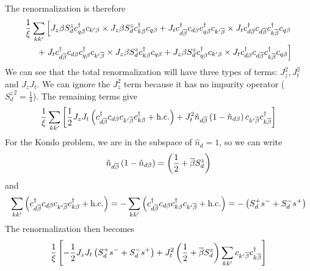 \documentclass[12pt,twoside]{report}
\numberwithin{equation}{section}
\begin{document}
The renormalization is therefore
\begin{equation}\begin{aligned}
	\frac{1}{\xi}\sum_{kk^\prime} \left[J_z \beta S_d^z c^\dagger_{q\beta}c_{k^\prime\beta}\times J_z \beta S_d^z c^\dagger_{k\beta}c_{q\beta} + J_t  c^\dagger_{d\overline\beta}c_{d\beta} c^\dagger_{q\beta}c_{k^\prime\overline\beta} \times J_t  c^\dagger_{d\beta}c_{d\overline\beta} c^\dagger_{k\overline\beta}c_{q\beta}\right.\\
	+\left. J_t  c^\dagger_{d\overline\beta}c_{d\beta} c^\dagger_{q\beta}c_{k^\prime\overline\beta}\times J_z \beta S_d^z c^\dagger_{k\beta}c_{q\beta} + J_z \beta S_d^z c^\dagger_{q\beta}c_{k^\prime\beta}\times J_t  c^\dagger_{d\beta}c_{d\overline\beta} c^\dagger_{k\overline\beta}c_{q\beta}\right]
\end{aligned}\end{equation}
We can see that the total renormalization will have three types of terms: \(J_z^2, J_t^2\) and \(J_z J_t\). We can ignore the \(J_z^2\) term because it has no impurity operator (\({S_d^z}^2 = \frac{1}{4}\)). The remaining terms give
\begin{equation}\begin{aligned}
	\label{kondo_part}
	\frac{1}{\xi}\sum_{kk^\prime} \left[\frac{1}{2} J_z J_t\left(c^\dagger_{d\overline\beta}c_{d\beta}c_{k^\prime\overline\beta}c^\dagger_{k\beta} + \text{h.c.}\right) + J_t^2 \hat n_{d\overline\beta}\left(1 - \hat n_{d\beta}\right) c_{k^\prime\overline\beta}c^\dagger_{k\overline\beta}\right]
\end{aligned}\end{equation}
For the Kondo problem, we are in the subspace of \(\hat n_d= 1\), so we can write
\begin{equation}\begin{aligned}
	\hat n_{d\overline\beta}\left(1 - \hat n_{d\beta}\right) = \left(\frac{1}{2} +  \overline\beta S_d^z \right)
\end{aligned}\end{equation}
and
\begin{equation}\begin{aligned}
	\sum_{kk^\prime}\left( c^\dagger_{d\overline\beta}c_{d\beta}c_{k^\prime\overline\beta}c^\dagger_{k\beta} + \text{h.c.}\right) = -\sum_{kk^\prime}\left( c^\dagger_{d\overline\beta}c_{d\beta}c^\dagger_{k\beta}c_{k^\prime\overline\beta} + \text{h.c.}\right) = -\left(S_d^+ s^- + S_d^- s^+\right)
\end{aligned}\end{equation}
The renormalization then becomes
\begin{equation}\begin{aligned}
	\frac{1}{\xi} \left[-\frac{1}{2} J_z J_t\left(S_d^+ s^- + S_d^- s^+\right) + J_t^2 \left(\frac{1}{2} +  \overline\beta S_d^z \right) \sum_{kk^\prime}c_{k^\prime\overline\beta}c^\dagger_{k\overline\beta}\right]
\end{aligned}\end{equation}
\end{document}

